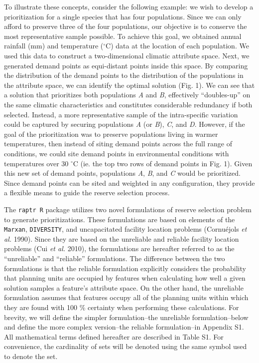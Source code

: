 To illustrate these concepts, consider the following example: we wish to
develop a prioritization for a single species that has four populations.
Since we can only afford to preserve three of the four populations, our
objective is to conserve the most representative sample possible. To
achieve this goal, we obtained annual rainfall (mm) and temperature
(\(^{\circ}\)C) data at the location of each population. We used this
data to construct a two-dimensional climatic attribute space. Next, we
generated demand points as equi-distant points inside this space. By
comparing the distribution of the demand points to the distribution of
the populations in the attribute space, we can identify the optimal
solution (Fig. 1). We can see that a solution that prioritizes both
populations \emph{A} and \emph{B}, effectively ``doubles-up'' on the
same climatic characteristics and constitutes considerable redundancy if
both selected. Instead, a more representative sample of the
intra-specific variation could be captured by securing populations
\emph{A} (or \emph{B}), \emph{C}, and \emph{D}. However, if the goal of
the prioritization was to preserve populations living in warmer
temperatures, then instead of siting demand points across the full range
of conditions, we could site demand points in environmental conditions
with temperatures over 30 \(^{\circ}\)C (ie. the top two rows of demand
points in Fig. 1). Given this new set of demand points, populations
\emph{A}, \emph{B}, and \emph{C} would be prioritized. Since demand
points can be sited and weighted in any configuration, they provide a
flexible means to guide the reserve selection process.

The \texttt{raptr R} package utilizes two novel formulations of reserve
selection problem to generate prioritizations. These formulations are
based on elements of the \texttt{Marxan}, \texttt{DIVERSITY}, and
uncapacitated facility location problems (Cornuéjols \emph{et al.}
1990). Since they are based on the unreliable and reliable facility
location problems (Cui \emph{et al.} 2010), the formulations are
hereafter referred to as the ``unreliable'' and ``reliable''
formulations. The difference between the two formulations is that the
reliable formulation explicitly considers the probability that planning
units are occupied by features when calculating how well a given
solution samples a feature's attribute space. On the other hand, the
unreliable formulation assumes that features occupy all of the planning
units within which they are found with 100 \% certainty when performing
these calculations. For brevity, we will define the simpler
formulation--the unreliable formulation--below and define the more
complex version--the reliable formulation--in Appendix S1. All
mathematical terms defined hereafter are described in Table S1. For
convenience, the cardinality of sets will be denoted using the same
symbol used to denote the set.

